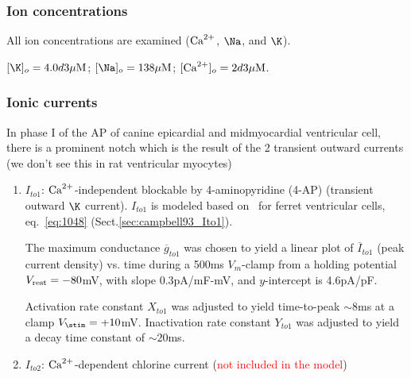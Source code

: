 \subsubsection{Ion concentrations}

All ion concentrations are examined (${\text{Ca}^{2+}}$, $\Na$, and $\K$).

$[\K]_o=4.0d3 \muM$; $[\Na]_o=138\muM$; $[{\text{Ca}^{2+}}]_o=2d3{\mu\text{M}}$. 

\subsubsection{Ionic currents}
\label{sec:ionic-currents-7}

In phase I of the AP of canine epicardial and midmyocardial ventricular cell,
there is a prominent notch which is the result of the 2 transient outward
currents (we don't see this in rat ventricular myocytes)
\begin{enumerate}
\item $I_{to1}$: ${\text{Ca}^{2+}}$-independent blockable by 4-aminopyridine
(4-AP) (transient outward $\K$ current). $I_{to1}$ is modeled based
on~\citep{Campbell1993} for ferret ventricular cells, eq.~\eqref{eq:1048}
(Sect.\ref{sec:campbell93_Ito1}).

  The maximum conductance $\overline{g}_{to1}$ was chosen to yield a linear
  plot of $\overline{I}_{to1}$ (peak current density) vs. time during a
  500ms $V_m$-clamp from a holding potential $V_{\text{rest}}=-80$mV, with
  slope 0.3pA/mF-mV, and $y$-intercept is 4.6pA/pF.

  Activation rate constant $X_{to1}$ was adjusted to yield
  time-to-peak $\sim 8$ms at a clamp $V_\stim =+10$mV.  Inactivation
  rate constant $Y_{to1}$ was adjusted to yield a decay time constant
  of $\sim 20$ms. 

\item $I_{to2}$: ${\text{Ca}^{2+}}$-dependent chlorine current (\textcolor{red}{not
    included in the model})
\end{enumerate}

